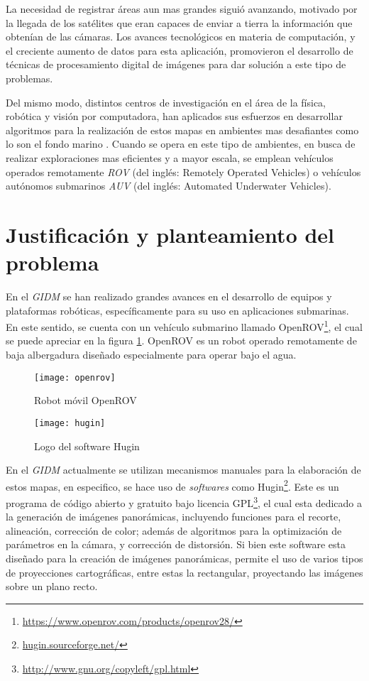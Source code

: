 La necesidad de registrar áreas aun mas grandes siguió avanzando, motivado por la llegada de los satélites que eran capaces de enviar a tierra la información que obtenían de las cámaras. Los avances tecnológicos en materia de computación, y el creciente aumento de datos para esta aplicación, promovieron el desarrollo de técnicas de procesamiento digital de imágenes para dar solución a este tipo de problemas.

Del mismo modo, distintos centros de investigación en el área de la física, robótica y visión por computadora, han aplicados sus esfuerzos en desarrollar algoritmos para la realización de estos mapas en ambientes mas desafiantes como lo son el fondo marino \cite{gracias-victor,Pizarro-singh,eustice,Allais}. Cuando se opera en este tipo de ambientes, en busca de realizar exploraciones mas eficientes y a mayor escala, se emplean vehículos operados remotamente \textit{ROV} (del inglés: Remotely Operated Vehicles) o vehículos autónomos submarinos \textit{AUV} (del inglés: Automated Underwater Vehicles). 

\section{Justificación y planteamiento del problema}

En el \textit{GIDM} se han realizado grandes avances en el desarrollo de equipos y plataformas robóticas, específicamente para su uso en aplicaciones submarinas. En este sentido, se cuenta con un vehículo submarino llamado OpenROV\footnote{\url{https://www.openrov.com/products/openrov28/}}, el cual se puede apreciar en la figura \ref{imagen:openrov}. OpenROV es un robot operado remotamente de baja albergadura diseñado especialmente para operar bajo el agua.

\begin{figure}[H]
	\centering
	\texttt{[image: openrov]}
	\caption{Robot móvil OpenROV}
	\label{imagen:openrov}
\end{figure}

\begin{wrapfigure}{r}{0.3\textwidth}
	\begin{center}
		\texttt{[image: hugin]}
	\end{center}
	\caption{Logo del software Hugin}
\end{wrapfigure}

En el \textit{GIDM} actualmente se utilizan mecanismos manuales para la elaboración de estos mapas, en especifico, se hace uso de \textit{softwares} como Hugin\footnote{\url{hugin.sourceforge.net/}}. Este es un programa de código abierto y gratuito bajo licencia GPL\footnote{\url{http://www.gnu.org/copyleft/gpl.html}}, el cual esta dedicado a la generación de imágenes panorámicas, incluyendo funciones para el recorte, alineación, corrección de color; además de algoritmos para la optimización de parámetros en la cámara, y corrección de distorsión. Si bien este software esta diseñado para la creación de imágenes panorámicas, permite el uso de varios tipos de proyecciones cartográficas, entre estas la rectangular, proyectando las imágenes sobre un plano recto.


